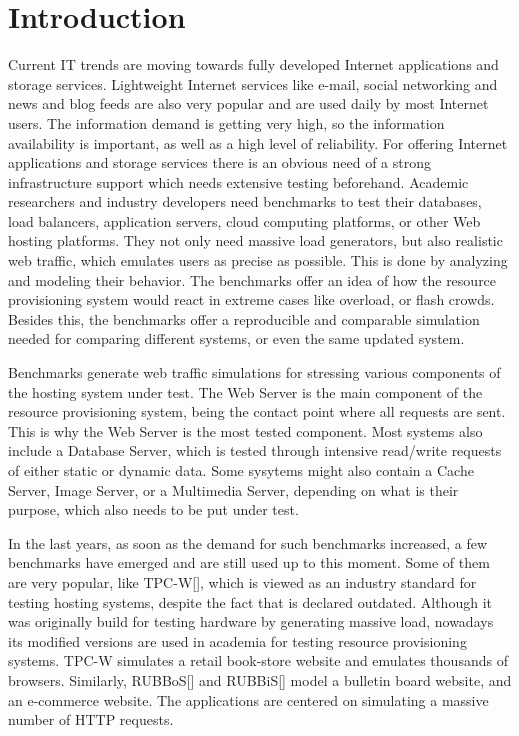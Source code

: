 \chapter{Introduction}
\label{chapter:chapter1}

Current IT trends are moving towards fully developed Internet applications and storage services. Lightweight Internet services like e-mail, social networking and news and blog feeds are also very popular and are used daily by most Internet users. The information demand is getting very high, so the information availability is important, as well as a high level of reliability. For offering Internet applications and storage services there is an obvious need of a strong infrastructure support which needs extensive testing beforehand. Academic researchers and industry developers need benchmarks to test their databases, load balancers, application servers, cloud computing platforms, or other Web hosting platforms. They not only need massive load generators, but also realistic web traffic, which emulates users as precise as possible. This is done by analyzing and modeling their behavior. The benchmarks offer an idea of how the resource provisioning system would react in extreme cases like overload, or flash crowds. Besides this, the benchmarks offer a reproducible and comparable simulation needed for comparing different systems, or even the same updated system.

Benchmarks generate web traffic simulations for stressing various components of the hosting system under test. The Web Server is the main component of the resource provisioning system, being the contact point where all requests are sent. This is why the Web Server is the most tested component. Most systems also include a Database Server, which is tested through intensive read/write requests of either static or dynamic data.  Some sysytems might also contain a Cache Server, Image Server, or a Multimedia Server, depending on what is their purpose, which also needs to be put under test.

In the last years, as soon as the demand for such benchmarks increased, a few benchmarks have emerged and are still used up to this moment. Some of them are very popular, like TPC-W[], which is viewed as an industry standard for testing hosting systems, despite the fact that is declared outdated. Although it was originally build for testing hardware by generating massive load, nowadays its modified versions are used in academia for testing resource provisioning systems.  TPC-W simulates a retail book-store website and emulates thousands of browsers. Similarly, RUBBoS[] and RUBBiS[] model a bulletin board website, and an e-commerce website. The applications are centered on simulating a massive number of HTTP requests.

